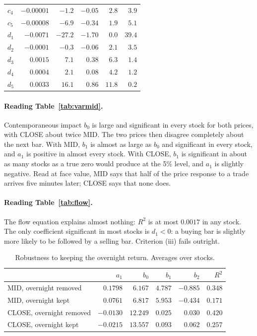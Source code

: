 \documentclass[11pt,a4paper]{article}
\begin{document}
\begin{table}[htbp]
\begin{tabular}{@{}lrrrrr@{}}
$c_4$ & $-0.00001$ & $-1.2$ & $-0.05$ & $2.8$ & $3.9$ \\
$c_5$ & $-0.00008$ & $-6.9$ & $-0.34$ & $1.9$ & $5.1$ \\
$d_1$ & $-0.0071$ & $-27.2$ & $-1.70$ & $0.0$ & $39.4$ \\
$d_2$ & $-0.0001$ & $-0.3$ & $-0.06$ & $2.1$ & $3.5$ \\
$d_3$ & $0.0015$ & $7.1$ & $0.38$ & $6.3$ & $1.4$ \\
$d_4$ & $0.0004$ & $2.1$ & $0.08$ & $4.2$ & $1.2$ \\
$d_5$ & $0.0033$ & $16.1$ & $0.86$ & $11.8$ & $0.2$ \\
\bottomrule
\end{tabular}
\end{table}

\paragraph{Reading Table~\ref{tab:varmid}.} Contemporaneous impact $b_0$ is large and significant in every
stock for both prices, with CLOSE about twice MID. The two prices then disagree completely about the
next bar. With MID, $b_1$ is almost as large as $b_0$ and significant in every stock, and $a_1$ is
positive in almost every stock. With CLOSE, $b_1$ is significant in about as many stocks as a true zero
would produce at the 5\% level, and $a_1$ is slightly negative. Read at face value, MID says that half
of the price response to a trade arrives five minutes later; CLOSE says that none does.

\paragraph{Reading Table~\ref{tab:flow}.} The flow equation explains almost nothing: $R^2$ is at most
$0.0017$ in any stock. The only coefficient significant in most stocks is $d_1<0$: a buying bar is
slightly more likely to be followed by a selling bar. Criterion (iii) fails outright.

\begin{table}[htbp]
\centering
\caption{Robustness to keeping the overnight return. Averages over stocks.}
\label{tab:overnight}
\small
\begin{tabular}{@{}lrrrrr@{}}
\toprule
& $a_1$ & $b_0$ & $b_1$ & $b_2$ & $R^2$ \\
\midrule
MID, overnight removed & $0.1798$ & $6.167$ & $4.787$ & $-0.885$ & $0.348$ \\
MID, overnight kept & $0.0761$ & $6.817$ & $5.953$ & $-0.434$ & $0.171$ \\
CLOSE, overnight removed & $-0.0130$ & $12.249$ & $0.025$ & $0.030$ & $0.420$ \\
CLOSE, overnight kept & $-0.0215$ & $13.557$ & $0.093$ & $0.062$ & $0.257$ \\
\bottomrule
\end{tabular}
\end{table}
\end{document}
